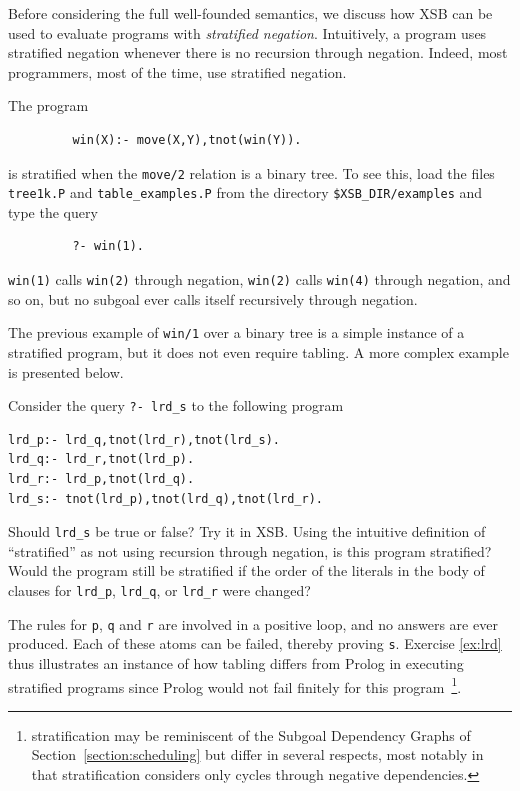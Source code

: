 Before considering the full well-founded semantics, we discuss how XSB
can be used to evaluate programs with {\em stratified negation}.
Intuitively, a program uses stratified negation whenever there is no
recursion through negation.  Indeed, most programmers, most of the
time, use stratified negation.  

\begin{exercise} \label{ex:win1}
The program
\begin{verbatim}
         win(X):- move(X,Y),tnot(win(Y)).
\end{verbatim}
is stratified when the {\tt move/2} relation is a binary tree.  To see
this, load the files \textup{\texttt{tree1k.P}} and
\textup{\texttt{table\_examples.P}} from the directory
\textup{\texttt{\$XSB\_DIR/examples}} and type the query
%
\begin{verbatim}
         ?- win(1).
\end{verbatim}
{\tt win(1)} calls {\tt win(2)} through negation, {\tt win(2)} calls
{\tt win(4)} through negation, and so on, but no subgoal ever calls
itself recursively through negation.
\end{exercise}

The previous example of {\tt win/1} over a binary tree is a simple
instance of a stratified program, but it does not even require
tabling.  A more complex example is presented below.

\begin{exercise} \label{ex:lrd}
Consider the query {\tt ?- lrd\_s} to the following program
\begin{verbatim}
lrd_p:- lrd_q,tnot(lrd_r),tnot(lrd_s).
lrd_q:- lrd_r,tnot(lrd_p).
lrd_r:- lrd_p,tnot(lrd_q).
lrd_s:- tnot(lrd_p),tnot(lrd_q),tnot(lrd_r). 
\end{verbatim}
Should {\tt lrd\_s} be true or false?  Try it in XSB\@.  Using the
intuitive definition of ``stratified'' as not using recursion through
negation, is this program stratified?  Would the program still be
stratified if the order of the literals in the body of clauses for
{\tt lrd\_p}, {\tt lrd\_q}, or {\tt lrd\_r} were changed?
\end{exercise}

The rules for {\tt p}, {\tt q} and {\tt r} are involved in a positive
loop, and no answers are ever produced.  Each of these atoms can be
failed, thereby proving {\tt s}.  Exercise \ref{ex:lrd} thus
illustrates an instance of how tabling differs from Prolog in
executing stratified programs since Prolog would not fail finitely for
this program~\footnote{\LRD stratification may be reminiscent of the
  Subgoal Dependency Graphs of Section~\ref{section:scheduling} but
  differ in several respects, most notably in that stratification
  considers only cycles through negative dependencies.}.

